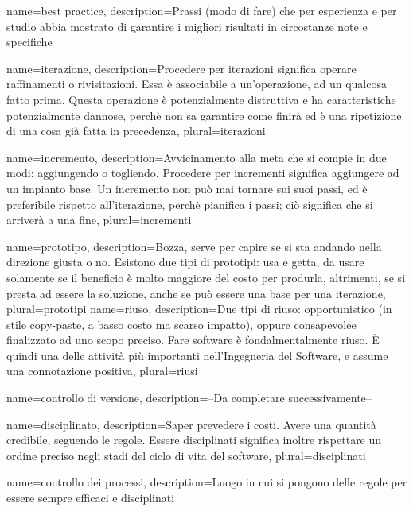 {
name=best practice,
description={Prassi (modo di fare) che per esperienza e per studio abbia mostrato di garantire i migliori risultati in circostanze note e specifiche}
}

{
name=iterazione,
description={Procedere per iterazioni significa operare raffinamenti o rivisitazioni. Essa \`e associabile a un'operazione, ad un qualcosa fatto prima. Questa operazione \`e potenzialmente distruttiva e ha caratteristiche potenzialmente dannose, perch\`e non sa garantire come finir\`a ed \`e una ripetizione di una cosa gi\`a fatta in precedenza},
plural=iterazioni
}

{
name=incremento,
description={Avvicinamento alla meta che si compie in due modi: aggiungendo o togliendo. Procedere per incrementi significa aggiungere ad un impianto base. Un incremento non pu\`o mai tornare sui suoi passi, ed \`e preferibile rispetto all'iterazione, perch\`e pianifica i passi; ci\`o significa che si arriver\`a a una fine},
plural=incrementi
}

{
name=prototipo,
description={Bozza, serve per capire se si sta andando nella direzione giusta o no. Esistono due tipi di prototipi: usa e getta, da usare solamente se il beneficio \`e molto maggiore del costo per produrla, altrimenti, se si presta ad essere la soluzione, anche se pu\`o essere una base per una iterazione},
plural=prototipi
}
{
name=riuso,
description={Due tipi di riuso: opportunistico (in stile copy-paste, a basso costo ma scarso impatto), oppure consapevolee finalizzato ad uno scopo preciso. Fare software \`e fondalmentalmente riuso. \`E quindi una delle attivit\`a pi\`u importanti nell'Ingegneria del Software, e assume una connotazione positiva},
plural=riusi
}

{
name=controllo di versione,
description={--Da completare successivamente--}
}

{
name=disciplinato,
description={Saper prevedere i costi. Avere una quantit\`a credibile, seguendo le regole. Essere disciplinati significa inoltre rispettare un ordine preciso negli stadi del ciclo di vita del software},
plural=disciplinati
}

{
name=controllo dei processi,
description={Luogo in cui si pongono delle regole per essere sempre efficaci e disciplinati}
}

